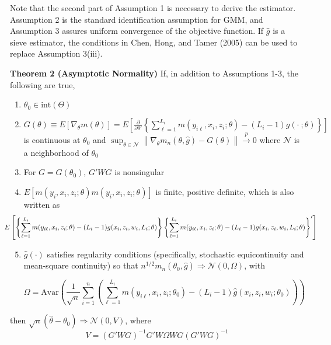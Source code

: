 \documentclass[12pt]{article}
\newcommand{\toP}{\overset{p}{\to}}
\begin{document}
Note that the second part of Assumption 1 is necessary to derive the estimator.  Assumption 2 is the standard identification assumption for GMM, and Assumption 3 assures uniform convergence of the  objective function.  If $\hat{g}$ is a sieve estimator, the conditions in Chen, Hong, and Tamer (2005) can be used to replace Assumption 3(iii). 




\textbf{Theorem 2 (Asymptotic Normality)} If, in addition to Assumptions 1-3, the following are true,
\begin{enumerate}[resume]
    \item $\theta_0 \in \text{int}(\Theta)$
    \item $G(\theta) \equiv E\left[\nabla_{\theta} m(\theta)\right] = E\left[\frac{\partial}{\partial \theta'} \left\{ \sum_{\ell=1}^{L_i} m(y_{i\ell}, x_i,z_i; \theta) - (L_i -1)g(\cdot\ ;\theta)\right\}\right]$ is continuous at $\theta_0$ and $\sup_{\theta\in \mathcal{N}} \left\lVert \nabla_{\theta}m_n(\theta,\hat{g}) - G(\theta)\right\rVert \toP 0 $ where $\mathcal{N}$ is a neighborhood of $\theta_0$
    \item For $G=G(\theta_0)$, $G'WG$ is nonsingular 
    \item $E\left[m(y_i, x_i, z_i; \theta)m(y_i, x_i, z_i; \theta)\right]$ is finite, positive definite, which is also written as
$$\hspace{-30pt} E\left[\left\{\sum_{\ell=1}^{L_i} m(y_{i\ell},x_i, z_i; \theta) - (L_i -1) g(x_i,z_i, w_i, L_i; \theta)\right\} \left\{ \sum_{\ell=1}^{L_i} m(y_{i\ell},x_i, z_i; \theta) - (L_i -1) g(x_i,z_i, w_i, L_i; \theta)\right\}'\right] $$
\item $\hat{g}(\cdot)$ satisfies regularity conditions (specifically, stochastic equicontinuity and mean-square continuity) so that $n^{1/2}m_n(\theta_0, \hat{g}) \Rightarrow \mathcal{N}(0,\Omega)$, with

$$ \Omega = \text{Avar}\left(\frac{1}{\sqrt{n}}\sum_{i=1}^n \left( \sum_{\ell =1}^{L_i} m(y_{i\ell}, x_i, z_i; \theta_0) - (L_i-1) \hat{g}(x_i, z_i, w_i; \theta_0)\right)  \right) $$

\end{enumerate}

then $\sqrt{n}(\hat{\theta}-\theta_0) \Rightarrow \mathcal{N}(0,V)$, where 
\begin{equation} V = (G'WG)^{-1}G'W\Omega W G(G'WG)^{-1} \label{avar}\end{equation}
\end{document}
